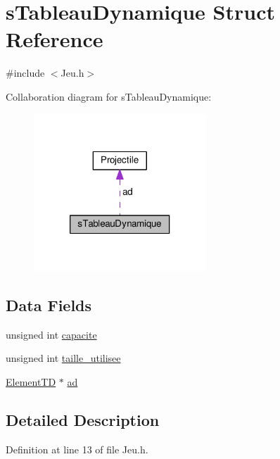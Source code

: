 \hypertarget{structs_tableau_dynamique}{\section{s\-Tableau\-Dynamique Struct Reference}
\label{structs_tableau_dynamique}
}


{\ttfamily \#include $<$Jeu.\-h$>$}



Collaboration diagram for s\-Tableau\-Dynamique\-:\nopagebreak
\begin{figure}[H]
\begin{center}
\leavevmode
\includegraphics[width=184pt]{structs_tableau_dynamique__coll__graph}
\end{center}
\end{figure}
\subsection*{Data Fields}
\begin{DoxyCompactItemize}
\item 
unsigned int \hyperlink{structs_tableau_dynamique_ac3e3c7196292bbc416a904d29ee638c8}{capacite}
\item 
unsigned int \hyperlink{structs_tableau_dynamique_aaf681889cbd00b7c45951f63b10f969a}{taille\-\_\-utilisee}
\item 
\hyperlink{_jeu_8h_a19f385bd48e6eaff3c61e8abf073263e}{Element\-T\-D} $\ast$ \hyperlink{structs_tableau_dynamique_a3b30ad6492b460f0995b66b2c8889426}{ad}
\end{DoxyCompactItemize}


\subsection{Detailed Description}


Definition at line 13 of file Jeu.\-h.




